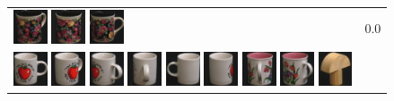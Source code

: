 {\begin{figure}[p]
\begin{tabular}{m{11cm} | m{3cm} |}
\includegraphics[width=1cm]{coil/beeld-63.eps}
\includegraphics[width=1cm]{coil/beeld-62.eps}
\includegraphics[width=1cm]{coil/beeld-60.eps}
& {\scriptsize 0.0}
\\
\includegraphics[width=1cm]{coil/beeld-36.eps}
\includegraphics[width=1cm]{coil/beeld-39.eps}
\includegraphics[width=1cm]{coil/beeld-40.eps}
\includegraphics[width=1cm]{coil/beeld-41.eps}
\includegraphics[width=1cm]{coil/beeld-37.eps}
\includegraphics[width=1cm]{coil/beeld-38.eps}
\includegraphics[width=1cm]{coil/beeld-11.eps}
\includegraphics[width=1cm]{coil/beeld-10.eps}
\includegraphics[width=1cm]{coil/beeld-3.eps}

\end{tabular}
\end{figure}}
